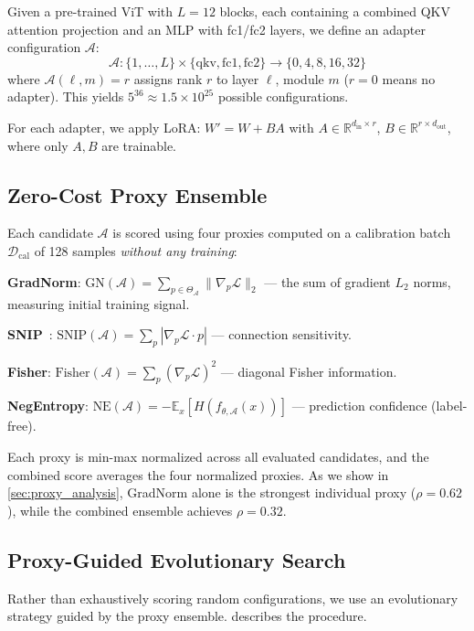 \documentclass[10pt,twocolumn,letterpaper]{article}
\begin{document}
Given a pre-trained ViT with $L=12$ blocks, each containing a combined QKV attention projection and an MLP with fc1/fc2 layers, we define an adapter configuration $\mathcal{A}$:
\begin{equation}
\mathcal{A}: \{1,\ldots,L\} \times \{\text{qkv}, \text{fc1}, \text{fc2}\} \rightarrow \{0, 4, 8, 16, 32\}
\end{equation}
where $\mathcal{A}(\ell, m) = r$ assigns rank $r$ to layer $\ell$, module $m$ ($r=0$ means no adapter). This yields $5^{36} \approx 1.5 \times 10^{25}$ possible configurations.

For each adapter, we apply LoRA: $W' = W + BA$ with $A \in \mathbb{R}^{d_\text{in} \times r}$, $B \in \mathbb{R}^{r \times d_\text{out}}$, where only $A, B$ are trainable.

\subsection{Zero-Cost Proxy Ensemble}
\label{sec:proxies}

Each candidate $\mathcal{A}$ is scored using four proxies computed on a calibration batch $\mathcal{D}_\text{cal}$ of 128 samples \emph{without any training}:

\textbf{GradNorm}: $\text{GN}(\mathcal{A}) = \sum_{p \in \Theta_\mathcal{A}} \|\nabla_p \mathcal{L}\|_2$ --- the sum of gradient $L_2$ norms, measuring initial training signal.

\textbf{SNIP}~\cite{lee2019snip}: $\text{SNIP}(\mathcal{A}) = \sum_p |\nabla_p \mathcal{L} \cdot p|$ --- connection sensitivity.

\textbf{Fisher}: $\text{Fisher}(\mathcal{A}) = \sum_p (\nabla_p \mathcal{L})^2$ --- diagonal Fisher information.

\textbf{NegEntropy}: $\text{NE}(\mathcal{A}) = -\mathbb{E}_x [H(f_{\theta,\mathcal{A}}(x))]$ --- prediction confidence (label-free).

Each proxy is min-max normalized across all evaluated candidates, and the combined score averages the four normalized proxies. As we show in \cref{sec:proxy_analysis}, GradNorm alone is the strongest individual proxy ($\rho = 0.62$), while the combined ensemble achieves $\rho = 0.32$.

\subsection{Proxy-Guided Evolutionary Search}

Rather than exhaustively scoring random configurations, we use an evolutionary strategy guided by the proxy ensemble.  describes the procedure.
\end{document}
